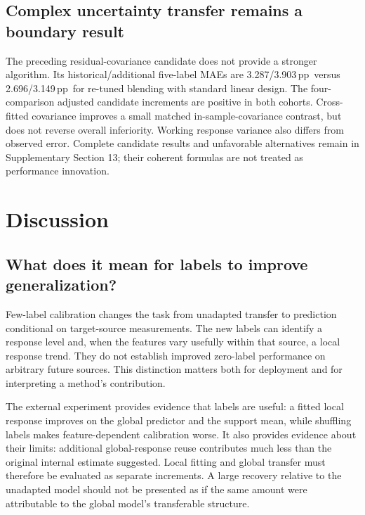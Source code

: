 \documentclass[11pt]{article}
\newcommand{\pp}{\,pp}
\begin{document}
\subsection{Complex uncertainty transfer remains a boundary result}
The preceding residual-covariance candidate does not provide a stronger algorithm. Its historical/additional five-label MAEs are 3.287/3.903\pp\ versus 2.696/3.149\pp\ for re-tuned blending with standard linear design. The four-comparison adjusted candidate increments are positive in both cohorts. Cross-fitted covariance improves a small matched in-sample-covariance contrast, but does not reverse overall inferiority. Working response variance also differs from observed error. Complete candidate results and unfavorable alternatives remain in Supplementary Section 13; their coherent formulas are not treated as performance innovation.


\FloatBarrier

\section{Discussion}
\subsection{What does it mean for labels to improve generalization?}
Few-label calibration changes the task from unadapted transfer to prediction conditional on target-source measurements. The new labels can identify a response level and, when the features vary usefully within that source, a local response trend. They do not establish improved zero-label performance on arbitrary future sources. This distinction matters both for deployment and for interpreting a method's contribution.

The external experiment provides evidence that labels are useful: a fitted local response improves on the global predictor and the support mean, while shuffling labels makes feature-dependent calibration worse. It also provides evidence about their limits: additional global-response reuse contributes much less than the original internal estimate suggested. Local fitting and global transfer must therefore be evaluated as separate increments. A large recovery relative to the unadapted model should not be presented as if the same amount were attributable to the global model's transferable structure.
\end{document}
